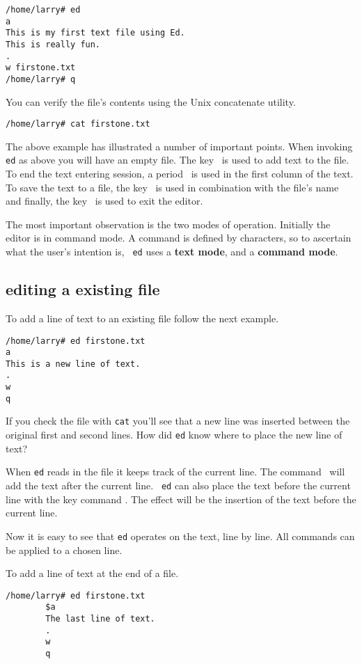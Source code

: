 \begin{verbatim}
/home/larry# ed
a
This is my first text file using Ed.
This is really fun.
.
w firstone.txt
/home/larry# q
\end{verbatim}

You can verify the file's contents using the Unix concatenate utility.
\begin{verbatim}
/home/larry# cat firstone.txt
\end{verbatim}

The above example has illustrated a number of important points. When
invoking {\tt ed} as above you will have an empty file. The key
\ is used to add text to the file. To end the text entering
session, a period \ is used in the first column of the text. To
save the text to a file, the key \ is used in combination with
the file's name and finally, the key \ is used to exit the
editor.

The most important observation is the two modes of operation.
Initially the editor is in command mode. A command is defined by
characters, so to ascertain what the user's intention is, {\tt
  ed} uses a {\bf text mode}, and a {\bf command mode}.

\subsection{editing a existing file}
To add a line of text to an existing file follow the next example. 
\begin{verbatim}
/home/larry# ed firstone.txt
a
This is a new line of text.
.
w
q
\end{verbatim}
        
If you check the file with {\tt cat} you'll see that a new line was
inserted between the original first and second lines. How did {\tt ed} know
where to place the new line of text?

When {\tt ed} reads in the file it keeps track of the current line.
The command \ will add the text after the current line. {\tt
  ed} can also place the text before the current line with the key
command . The effect will be the insertion of the text before
the current line.

Now it is easy to see that {\tt ed} operates on the text, line by line. All commands
can be applied to a chosen line.

To add a line of text at the end of a file.
\begin{verbatim}
/home/larry# ed firstone.txt
        $a
        The last line of text.
        .
        w
        q
\end{verbatim}


